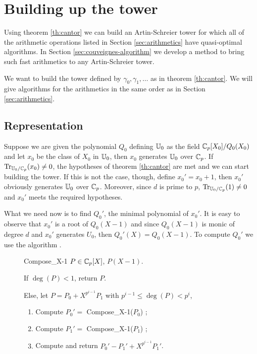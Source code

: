 \section{Building up the tower}
\label{sec:building-up}

Using theorem \ref{th:cantor} we can build an Artin-Schreier tower for
which all of the arithmetic operations listed in Section
\ref{sec:arithmetics} have quasi-optimal algorithms. In Section
\ref{sec:couveignes-algorithm} we develop a method to bring such fast
arithmetics to any Artin-Schreier tower.

We want to build the tower defined by $\gamma_0,\gamma_1,\ldots$ as in
theorem \ref{th:cantor}. We will give algorithms for the arithmetics
in the same order as in Section \ref{sec:arithmetics}.

\subsection{Representation}
Suppose we are given the polynomial $Q_0$ defining $\mathbb{U}_0$ as the field
$\mathbb{C}_p[X_0]/Q_0(X_0)$ and let $x_0$ be the class of $X_0$ in $\mathbb{U}_0$,
then $x_0$ generates $\mathbb{U}_0$ over $\mathbb{C}_p$. If
$\operatorname{Tr}_{\mathbb{U}_0/\mathbb{C}_p}(x_0)\ne0$, the hypotheses of theorem \ref{th:cantor}
are met and we can start building the tower. If this is not the case,
though, define $x_0'=x_0+1$, then $x_0'$ obviously generates $\mathbb{U}_0$
over $\mathbb{C}_p$. Moreover, since $d$ is prime to $p$,
$\operatorname{Tr}_{\mathbb{U}_0/\mathbb{C}_p}(1)\ne0$ and $x_0'$ meets the required
hypotheses.

What we need now is to find $Q_0'$, the minimal polynomial of
$x_0'$. It is easy to observe that $x_0'$ is a root of $Q_0(X-1)$ and
since $Q_0(X-1)$ is monic of degree $d$ and $x_0'$ generates $U_0$,
then $Q_0'(X) = Q_0(X-1)$. To compute $Q_0'$ we use the algorithm
.

\begin{figure}[!h]
  \begin{algorithm}
    {Compose\_X-1}
    {$P\in\mathbb{C}_p[X]$,}
    {$P(X-1)$.}
  \item If $\deg(P) < 1$, return $P$.
  \item Else, let $P = P_0 + X^{p^{i-1}}P_1$ with $p^{i-1}\le\deg(P)<p^i$,
    \begin{enumerate}
      \item Compute $P_0' =$ Compose\_X-1($P_0$) ;
      \item Compute $P_1' =$ Compose\_X-1($P_1$) ;
      \item \label{alg:compose-x-1:sum}Compute and return $P_0' - P_1'
        + X^{p^{i-1}}P_1'$.
    \end{enumerate}
  \end{algorithm}
\end{figure}


